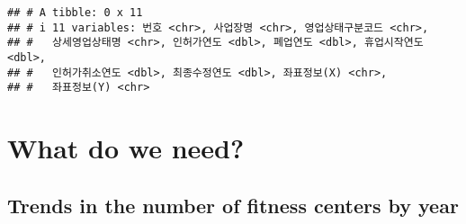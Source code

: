 \documentclass[
]{book}
\newenvironment{Shaded}{\begin{snugshade}}{\end{snugshade}}
\newcommand{\CommentTok}[1]{\textcolor[rgb]{0.56,0.35,0.01}{\textit{#1}}}
\newcommand{\FunctionTok}[1]{\textcolor[rgb]{0.00,0.00,0.00}{#1}}
\newcommand{\NormalTok}[1]{#1}
\newcommand{\OtherTok}[1]{\textcolor[rgb]{0.56,0.35,0.01}{#1}}
\newcommand{\SpecialCharTok}[1]{\textcolor[rgb]{0.00,0.00,0.00}{#1}}
\newcommand{\StringTok}[1]{\textcolor[rgb]{0.31,0.60,0.02}{#1}}
\begin{document}
\begin{itemize}
\begin{Shaded}
\end{Shaded}

\begin{verbatim}
## # A tibble: 0 x 11
## # i 11 variables: 번호 <chr>, 사업장명 <chr>, 영업상태구분코드 <chr>,
## #   상세영업상태명 <chr>, 인허가연도 <dbl>, 폐업연도 <dbl>, 휴업시작연도 <dbl>,
## #   인허가취소연도 <dbl>, 최종수정연도 <dbl>, 좌표정보(X) <chr>,
## #   좌표정보(Y) <chr>
\end{verbatim}
\end{itemize}

\hypertarget{what-do-we-need}{%
\section{What do we need?}\label{what-do-we-need}}

\hypertarget{trends-in-the-number-of-fitness-centers-by-year}{%
\subsection{Trends in the number of fitness centers by year}\label{trends-in-the-number-of-fitness-centers-by-year}}
\end{document}
